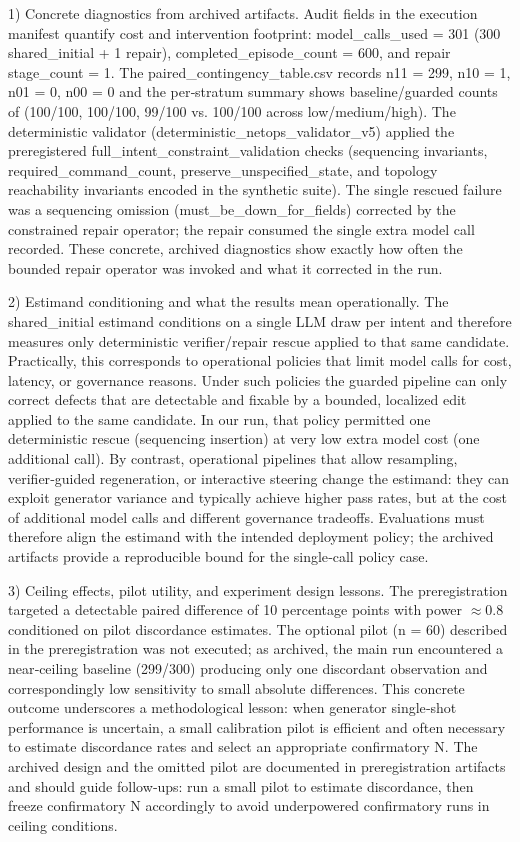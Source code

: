 \documentclass[conference]{IEEEtran}
\begin{document}
1) Concrete diagnostics from archived artifacts. Audit fields in the execution manifest quantify cost and intervention footprint: model\_calls\_used = 301 (300 shared\_initial + 1 repair), completed\_episode\_count = 600, and repair stage\_count = 1. The paired\_contingency\_table.csv records n11 = 299, n10 = 1, n01 = 0, n00 = 0 and the per‑stratum summary shows baseline/guarded counts of (100/100, 100/100, 99/100 vs. 100/100 across low/medium/high). The deterministic validator (deterministic\_netops\_validator\_v5) applied the preregistered full\_intent\_constraint\_validation checks (sequencing invariants, required\_command\_count, preserve\_unspecified\_state, and topology reachability invariants encoded in the synthetic suite). The single rescued failure was a sequencing omission (must\_be\_down\_for\_fields) corrected by the constrained repair operator; the repair consumed the single extra model call recorded. These concrete, archived diagnostics show exactly how often the bounded repair operator was invoked and what it corrected in the run.

2) Estimand conditioning and what the results mean operationally. The shared\_initial estimand conditions on a single LLM draw per intent and therefore measures only deterministic verifier/repair rescue applied to that same candidate. Practically, this corresponds to operational policies that limit model calls for cost, latency, or governance reasons. Under such policies the guarded pipeline can only correct defects that are detectable and fixable by a bounded, localized edit applied to the same candidate. In our run, that policy permitted one deterministic rescue (sequencing insertion) at very low extra model cost (one additional call). By contrast, operational pipelines that allow resampling, verifier‑guided regeneration, or interactive steering change the estimand: they can exploit generator variance and typically achieve higher pass rates, but at the cost of additional model calls and different governance tradeoffs. Evaluations must therefore align the estimand with the intended deployment policy; the archived artifacts provide a reproducible bound for the single‑call policy case.

3) Ceiling effects, pilot utility, and experiment design lessons. The preregistration targeted a detectable paired difference of 10 percentage points with power \ensuremath{\approx}0.8 conditioned on pilot discordance estimates. The optional pilot (n = 60) described in the preregistration was not executed; as archived, the main run encountered a near‑ceiling baseline (299/300) producing only one discordant observation and correspondingly low sensitivity to small absolute differences. This concrete outcome underscores a methodological lesson: when generator single‑shot performance is uncertain, a small calibration pilot is efficient and often necessary to estimate discordance rates and select an appropriate confirmatory N. The archived design and the omitted pilot are documented in preregistration artifacts and should guide follow‑ups: run a small pilot to estimate discordance, then freeze confirmatory N accordingly to avoid underpowered confirmatory runs in ceiling conditions.
\end{document}
